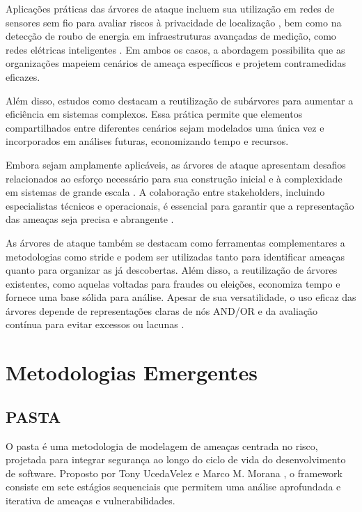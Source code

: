 Aplicações práticas das árvores de ataque incluem sua utilização em
redes de sensores sem fio para avaliar riscos à privacidade de
localização \cite{AnAttackTreeBasedRisk}, bem como na detecção de
roubo de energia em infraestruturas avançadas de medição, como redes
elétricas inteligentes \cite{Energytheftdetectionissues}. Em ambos os
casos, a abordagem possibilita que as organizações mapeiem cenários de
ameaça específicos e projetem contramedidas eficazes.

Além disso, estudos como \cite{FoundationsofAttackTrees} destacam a
reutilização de subárvores para aumentar a eficiência em sistemas
complexos. Essa prática permite que elementos compartilhados entre
diferentes cenários sejam modelados uma única vez e incorporados em
análises futuras, economizando tempo e recursos.

Embora sejam amplamente aplicáveis, as árvores de ataque apresentam
desafios relacionados ao esforço necessário para sua construção
inicial e à complexidade em sistemas de grande escala
\cite{AttackTrees}. A colaboração entre stakeholders, incluindo
especialistas técnicos e operacionais, é essencial para garantir que a
representação das ameaças seja precisa e abrangente
\cite{Energytheftdetectionissues}.

As árvores de ataque também se destacam como ferramentas
complementares a metodologias como \gls{stride} e podem ser utilizadas tanto
para identificar ameaças quanto para organizar as já descobertas. Além
disso, a reutilização de árvores existentes, como aquelas voltadas
para fraudes ou eleições, economiza tempo e fornece uma base sólida
para análise. Apesar de sua versatilidade, o uso eficaz das árvores
depende de representações claras de nós AND/OR e da avaliação contínua
para evitar excessos ou lacunas \cite{ThreatModelingdesigningForSecurity}.

\section{Metodologias Emergentes}
\label{sec:emerging_methodologies}

\subsection{PASTA}
\label{subsec:pasta}

O \gls{pasta} é uma
metodologia de modelagem de ameaças centrada no risco, projetada para
integrar segurança ao longo do ciclo de vida do desenvolvimento de
software. Proposto por Tony UcedaVelez e Marco M. Morana
\cite{RiskCentricThreatModeling}, o framework consiste em sete
estágios sequenciais que permitem uma análise aprofundada e iterativa
de ameaças e vulnerabilidades.

